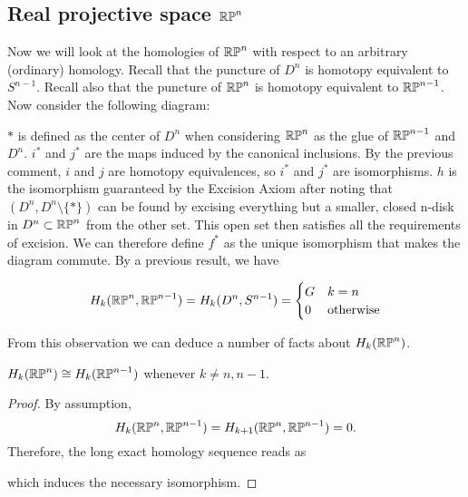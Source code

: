 \subsection{Real projective space $\mathbb{RP}^{n}$}
Now we will look at the homologies of $\mathbb{RP}^{n}$ with respect to an arbitrary (ordinary) homology. Recall that the puncture of $D^n$ is homotopy equivalent to $S^{n-1}$. Recall also that the puncture of $\mathbb{RP}^{n}$ is homotopy equivalent to $\mathbb{RP}^{n-1}$. Now consider the following diagram:


$*$ is defined as the center of $D^n$ when considering $\mathbb{RP}^{n}$ as the glue of $\mathbb{RP}^{n-1}$ and $D^n$. $i^*$ and $j^*$ are the maps induced by the canonical inclusions. By the previous comment, $i$ and $j$ are homotopy equivalences, so $i^*$ and $j^*$ are isomorphisms. $h$ is the isomorphism guaranteed by the Excision Axiom after noting that $(D^n,D^n\setminus \{*\})$ can be found by excising everything but a smaller, closed n-disk in $D^n\subset \mathbb{RP}^{n}$ from the other set. This open set then satisfies all the requirements of excision. We can therefore define $f^*$ as the unique isomorphism that makes the diagram commute. By a previous result, we have 

\[H_k(\mathbb{RP}^{n},\mathbb{RP}^{n-1})=H_k(D^n,S^{n-1})=
\begin{cases} 
      G & k=n \\
      0 & \text{otherwise}
   \end{cases}
\]

From this observation we can deduce a number of facts about $H_k(\mathbb{RP}^{n})$.

\begin{lemma}
\label{projective-space-iso}
$H_k(\mathbb{RP}^{n})\cong H_k(\mathbb{RP}^{n-1})$ whenever $k\neq n,n-1$.
\end{lemma}
\begin{proof}
By assumption, $$H_k(\mathbb{RP}^{n},\mathbb{RP}^{n-1})=H_{k+1}(\mathbb{RP}^{n},\mathbb{RP}^{n-1})=0.$$
Therefore, the long exact homology sequence reads as


which induces the necessary isomorphism.
\end{proof}

